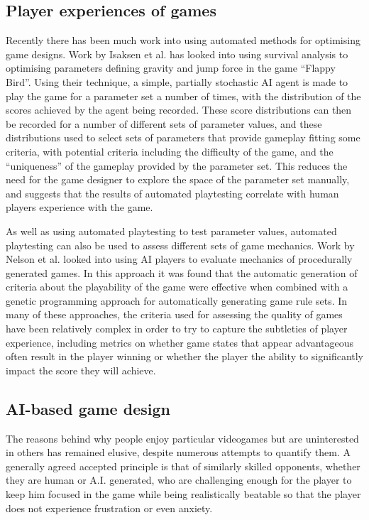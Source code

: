 \subsection{Player experiences of games}

Recently there has been much work into using automated methods for optimising game designs. Work by Isaksen et al.\cite{isaksen2015exploring}\cite{isaksendiscovering} has looked into using survival analysis to optimising parameters defining gravity and jump force in the game ``Flappy Bird''. Using their technique, a simple, partially stochastic AI agent is made to play the game for a parameter set a number of times, with the distribution of the scores achieved by the agent being recorded. These score distributions can then be recorded for a number of different sets of parameter values, and these distributions used to select sets of parameters that provide gameplay fitting some criteria, with potential criteria including the difficulty of the game, and the ``uniqueness'' of the gameplay provided by the parameter set. This reduces the need for the game designer to explore the space of the parameter set manually, and suggests that the results of automated playtesting correlate with human players experience with the game.

As well as using automated playtesting to test parameter values, automated playtesting can also be used to assess different sets of game mechanics. Work by Nelson et al. looked into using AI players to evaluate mechanics of procedurally generated games\cite{nelson2015rules}. In this approach it was found that the automatic generation of criteria about the playability of the game were effective when combined with a genetic programming approach for automatically generating game rule sets. In many of these approaches, the criteria used for assessing the quality of games have been relatively complex in order to try to capture the subtleties of player experience, including metrics on whether game states that appear advantageous often result in the player winning\cite{nelson2015rules} or whether the player the ability to significantly impact the score they will achieve\cite{cook2011multi}.

\subsection{AI-based game design}

The reasons behind why people enjoy particular videogames but are uninterested in others has remained elusive, despite numerous attempts to quantify them\cite{yannakakis2006modeling}\cite{procci2012measuring}. A generally agreed accepted principle is that of similarly skilled opponents, whether they are human or A.I. generated, who are challenging enough for the player to keep him focused in the game while being realistically beatable so that the player does not experience frustration or even anxiety\cite{ibanez2011adaptive}.

